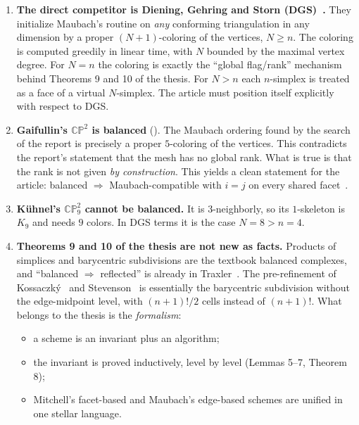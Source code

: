 \documentclass[11pt]{article}
\newcommand{\CP}{\mathbb{CP}}
\begin{document}
\begin{enumerate}[leftmargin=*,itemsep=4pt]
\item \textbf{The direct competitor is Diening, Gehring and Storn
  (DGS)~\cite{dgs2025}.} They initialize Maubach's routine on \emph{any}
  conforming triangulation in any dimension by a proper $(N{+}1)$-coloring
  of the vertices, $N\ge n$. The coloring is computed greedily in linear
  time, with $N$ bounded by the maximal vertex degree. For $N=n$ the coloring
  is exactly the ``global flag/rank'' mechanism behind Theorems 9 and 10 of
  the thesis. For $N>n$ each $n$-simplex is treated as a face of a virtual
  $N$-simplex. The article must position itself explicitly with respect to
  DGS.

\item \textbf{Gaifullin's $\CP^2$ is balanced}
  (). The Maubach ordering found by the search of the
  report is precisely a proper $5$-coloring of the vertices. This contradicts
  the report's statement that the mesh has no global rank. What is true is
  that the rank is not given \emph{by construction}. This yields a clean
  statement for the article: balanced $\Rightarrow$ Maubach-compatible with
  $i=j$ on every shared facet~\cite{traxler1997,dgs2025}.

\item \textbf{Kühnel's $\CP^2_9$ cannot be balanced.} It is
  $3$-neighborly, so its $1$-skeleton is $K_9$ and needs $9$ colors. In DGS
  terms it is the case $N=8>n=4$.

\item \textbf{Theorems 9 and 10 of the thesis are not new as facts.}
  Products of simplices and barycentric subdivisions are the textbook
  balanced complexes, and ``balanced $\Rightarrow$ reflected'' is already in
  Traxler~\cite{traxler1997}. The pre-refinement of
  Kossaczký~\cite{kossaczky1994} and Stevenson~\cite[App.~A]{stevenson2008}
  is essentially the barycentric subdivision without the edge-midpoint
  level, with $(n{+}1)!/2$ cells instead of $(n{+}1)!$. What belongs to the
  thesis is the \emph{formalism}:
  \begin{itemize}[itemsep=0pt]
  \item a scheme is an invariant plus an algorithm;
  \item the invariant is proved inductively, level by level (Lemmas 5--7,
    Theorem 8);
  \item Mitchell's facet-based and Maubach's edge-based schemes are unified
    in one stellar language.
  \end{itemize}


\end{enumerate}
\end{document}
